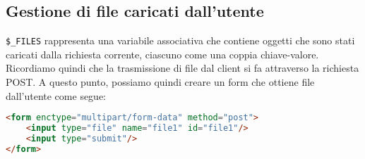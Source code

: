 \documentclass[a4paper,11pt]{article}
\begin{document}
\subsection{Gestione di file caricati dall'utente}

\lstinline|$_FILES| rappresenta una variabile associativa che contiene oggetti che sono stati caricati dalla richiesta corrente, ciascuno come una coppia chiave-valore.
Ricordiamo quindi che la trasmissione di file dal client si fa attraverso la richiesta POST.
A questo punto, possiamo quindi creare un form che ottiene file dall'utente come segue:
\begin{lstlisting}[language=html, style=codestyle]	
<form enctype="multipart/form-data" method="post">
	<input type="file" name="file1" id="file1"/>
	<input type="submit"/>
</form>
\end{lstlisting}
\end{document}
